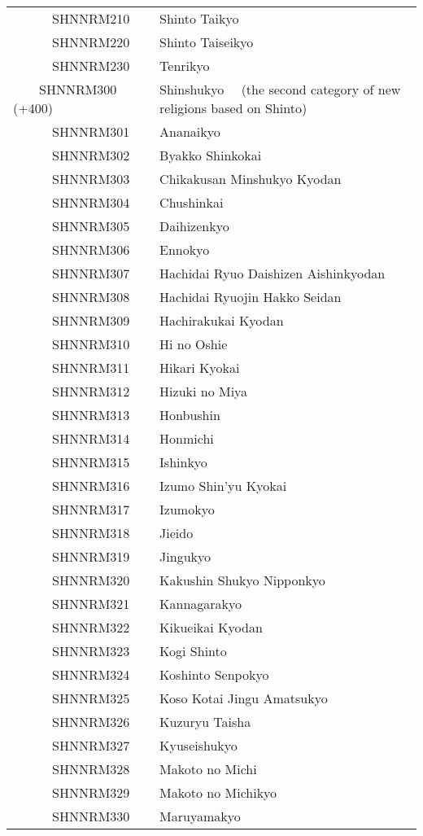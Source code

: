 \documentclass[12pt]{article}
\begin{document}
\begin{tiny}
\begin{center}
\begin{longtable}{|l|l|}
~~~~~~SHNNRM210 & Shinto Taikyo \\
~~~~~~SHNNRM220 & Shinto Taiseikyo \\
~~~~~~SHNNRM230 & Tenrikyo \\
~~~~SHNNRM300 (+400) & Shinshukyo	~~(the second category of new religions based on Shinto) \\
~~~~~~SHNNRM301 & Ananaikyo \\
~~~~~~SHNNRM302 & Byakko Shinkokai \\
~~~~~~SHNNRM303 & Chikakusan Minshukyo Kyodan \\
~~~~~~SHNNRM304 & Chushinkai \\
~~~~~~SHNNRM305 & Daihizenkyo \\
~~~~~~SHNNRM306 & Ennokyo \\
~~~~~~SHNNRM307 & Hachidai Ryuo Daishizen Aishinkyodan \\
~~~~~~SHNNRM308 & Hachidai Ryuojin Hakko Seidan \\
~~~~~~SHNNRM309 & Hachirakukai Kyodan \\
~~~~~~SHNNRM310 & Hi no Oshie \\
~~~~~~SHNNRM311 & Hikari Kyokai \\
~~~~~~SHNNRM312 & Hizuki no Miya \\
~~~~~~SHNNRM313 & Honbushin \\
~~~~~~SHNNRM314 & Honmichi \\
~~~~~~SHNNRM315 & Ishinkyo \\
~~~~~~SHNNRM316 & Izumo Shin’yu Kyokai \\
~~~~~~SHNNRM317 & Izumokyo \\
~~~~~~SHNNRM318 & Jieido \\
~~~~~~SHNNRM319 & Jingukyo \\
~~~~~~SHNNRM320 & Kakushin Shukyo Nipponkyo \\
~~~~~~SHNNRM321 & Kannagarakyo \\
~~~~~~SHNNRM322 & Kikueikai Kyodan \\
~~~~~~SHNNRM323 & Kogi Shinto \\
~~~~~~SHNNRM324 & Koshinto Senpokyo \\
~~~~~~SHNNRM325 & Koso Kotai Jingu Amatsukyo \\
~~~~~~SHNNRM326 & Kuzuryu Taisha \\
~~~~~~SHNNRM327 & Kyuseishukyo \\
~~~~~~SHNNRM328 & Makoto no Michi \\
~~~~~~SHNNRM329 & Makoto no Michikyo \\
~~~~~~SHNNRM330 & Maruyamakyo \\

\end{longtable}
\end{center}
\end{tiny}
\end{document}
